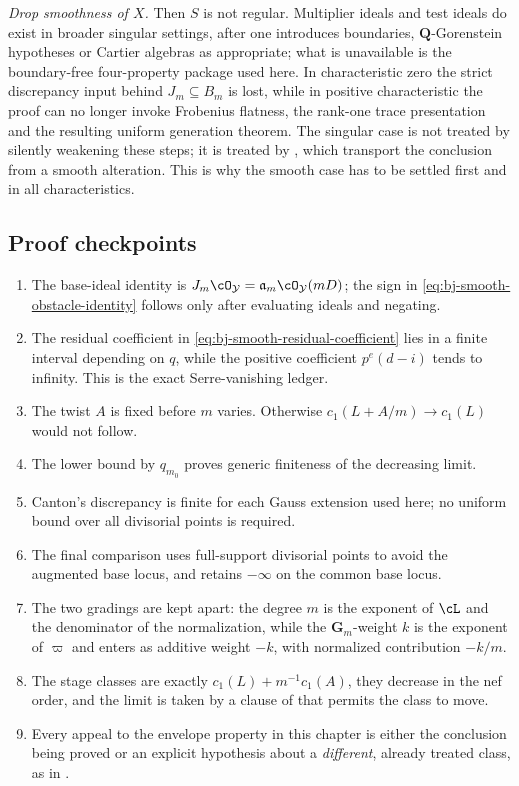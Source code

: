 \emph{Drop smoothness of $X$.}  Then $S$ is not regular.  Multiplier
ideals and test ideals do exist in broader singular settings, after one
introduces boundaries, $\mathbf Q$-Gorenstein hypotheses or Cartier
algebras as appropriate; what is unavailable is the boundary-free
four-property package used here.  In characteristic zero the strict
discrepancy input behind $J_m\subseteq B_m$ is lost, while in positive
characteristic the proof can no longer invoke Frobenius flatness, the
rank-one trace presentation and the resulting uniform generation theorem.
The singular case is not treated by silently weakening these steps; it is
treated by
,
which transport the conclusion from a smooth alteration.  This is why the
smooth case has to be settled first and in all characteristics.

\subsection{Proof checkpoints}
\label{sec:ch40-checkpoints}

\begin{enumerate}
\item The base-ideal identity is
      $J_m\cO_{\mathcal Y}=\mathfrak a_m\cO_{\mathcal Y}(mD)$;
      the sign in \eqref{eq:bj-smooth-obstacle-identity} follows only
      after evaluating ideals and negating.
\item The residual coefficient in
      \eqref{eq:bj-smooth-residual-coefficient} lies in a finite interval
      depending on $q$, while the positive coefficient
      $p^e(d-i)$ tends to infinity.  This is the exact Serre-vanishing
      ledger.
\item The twist $A$ is fixed before $m$ varies.  Otherwise
      $c_1(L+A/m)\to c_1(L)$ would not follow.
\item The lower bound by $q_{m_0}$ proves generic finiteness of the
      decreasing limit.
\item Canton's discrepancy is finite for each Gauss extension used here;
      no uniform bound over all divisorial points is required.
\item The final comparison uses full-support divisorial points to avoid
      the augmented base locus, and retains $-\infty$ on the common
      base locus.
\item The two gradings are kept apart: the degree $m$ is the exponent of
      $\cL$ and the denominator of the normalization, while the
      $\mathbf G_m$-weight $k$ is the exponent of $\varpi$ and enters
      as additive weight $-k$, with normalized contribution $-k/m$.
\item The stage classes are exactly $c_1(L)+m^{-1}c_1(A)$, they decrease
      in the nef order, and the limit is taken by a clause of
       that permits the class to move.
\item Every appeal to the envelope property in this chapter is either the
      conclusion being proved or an explicit hypothesis about a
      \emph{different}, already treated class, as in
      .
\end{enumerate}


